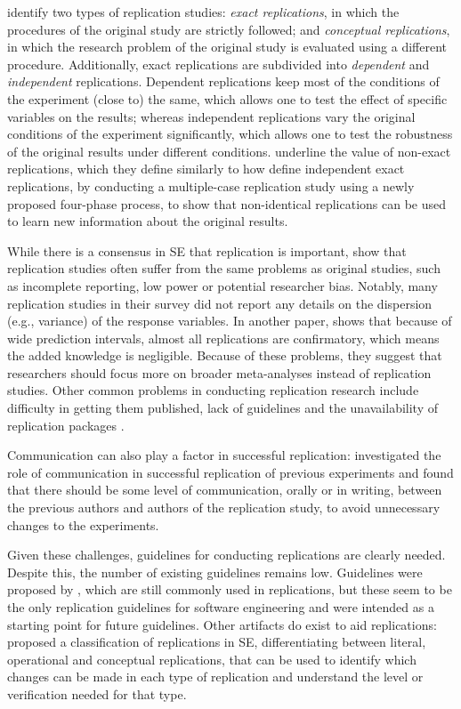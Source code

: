 \documentclass[a4paper]{article}
\begin{document}
\textcite{Shull2008} identify two types of replication studies: \textit{exact replications}, in which the procedures of the original study are strictly followed; and \textit{conceptual replications}, in which the research problem of the original study is evaluated using a different procedure. Additionally, exact replications are subdivided into \textit{dependent} and \textit{independent} replications. Dependent replications keep most of the conditions of the experiment (close to) the same, which allows one to test the effect of specific variables on the results; whereas independent replications vary the original conditions of the experiment significantly, which allows one to test the robustness of the original results under different conditions. \textcite{Juristo2010} underline the value of non-exact replications, which they define similarly to how \citeauthor*{Shull2008} define independent exact replications, by conducting a multiple-case replication study using a newly proposed four-phase process, to show that non-identical replications can be used to learn new information about the original results.

While there is a consensus in SE that replication is important, \textcite{Shepperd2018} show that replication studies often suffer from the same problems as original studies, such as incomplete reporting, low power or potential researcher bias. Notably, many replication studies in their survey did not report any details on the dispersion (e.g., variance) of the response variables. In another paper, \textcite{Shepperd2018b} shows that because of wide prediction intervals, almost all replications are confirmatory, which means the added knowledge is negligible. Because of these problems, they suggest that researchers should focus more on broader meta-analyses instead of replication studies. Other common problems in conducting replication research include difficulty in getting them published, lack of guidelines and the unavailability of replication packages \cite{Cruz2020,Siegmund2015}.

Communication can also play a factor in successful replication: \textcite{Vegas2006} investigated the role of communication in successful replication of previous experiments and found that there should be some level of communication, orally or in writing, between the previous authors and authors of the replication study, to avoid unnecessary changes to the experiments. 

Given these challenges, guidelines for conducting replications are clearly needed. Despite this, the number of existing guidelines remains low. Guidelines were proposed by \textcite{carver2010}, which are still commonly used in replications, but these seem to be the only replication guidelines for software engineering and were intended as a starting point for future guidelines. Other artifacts do exist to aid replications: \textcite{Gomez2014} proposed a classification of replications in SE, differentiating between literal, operational and conceptual replications, that can be used to identify which changes can be made in each type of replication and understand the level or verification needed for that type. 
\end{document}
